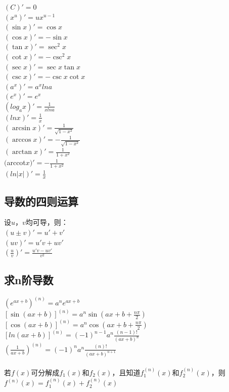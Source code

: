 \documentclass{article}
\begin{document}
\begin{flushleft}
	$(C)'=0$\\
	$(x^u)'=ux^{u-1}$\\
	$(\sin x)'=\cos x$\\
	$(\cos x)'=-\sin x$\\
	$(\tan x)'=\sec^2 x$\\
	$(\cot x)'=-\csc^2 x$\\
	$(\sec x)'=\sec x\tan x$\\
	$(\csc x)'=-\csc x\cot x$\\
	$(a^x)'=a^xlna$\\
	$(e^x)'=e^x$\\
	$(log_ax)'=\frac{1}{xlna}$\\
	$(lnx)'=\frac{1}{x}$\\
	$(\arcsin x)'=\frac{1}{\sqrt{1-x^2}}$\\
	$(\arccos x)'=-\frac{1}{\sqrt{1-x^2}}$\\
	$(\arctan x)'=\frac{1}{1+x^2}$\\
	$($arccot$ x)'=-\frac{1}{1+x^2}$\\
	$(ln|x|)'=\frac{1}{x}$\\
	
	\subsection{导数的四则运算}
	
	设$u，v$均可导，则：\\
	$(u\pm v)'=u'+v'$\\
	$(uv)'=u'v+uv'$\\
	$(\frac{u}{v})'=\frac{u'v-uv'}{v^2}$\\
	
	\subsection{求n阶导数}
	
	$(e^{ax+b})^{(n)}=a^ne^{ax+b}$\\
	$[\sin(ax+b)]^{(n)}=a^n\sin(ax+b+\frac{n\pi}{2})$\\
	$[\cos(ax+b)]^{(n)}=a^n\cos(ax+b+\frac{n\pi}{2})$\\
	$[ln(ax+b)]^{(n)}=(-1)^{n-1}a^n\frac{(n-1)!}{(ax+b)^n}$\\
	$(\frac{1}{ax+b})^{(n)}=(-1)^{n}a^n\frac{(n)!}{(ax+b)^{n+1}}$\\
	~\\
	若$f(x)$可分解成$f_1(x)$和$f_2(x)$，且知道$f_1^{(n)}(x)$和$f_2^{(n)}(x)$，则$f^{(n)}(x)=f_1^{(n)}(x)+f_2^{(n)}(x)$\\
	~\\

\end{flushleft}
\end{document}
